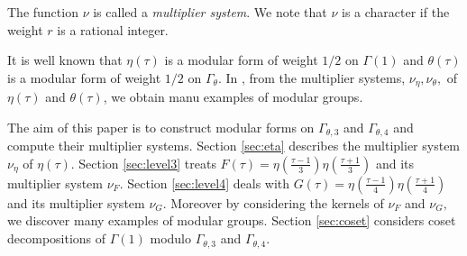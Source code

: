 \documentclass[12pt]{article}
\theoremstyle{definition}
\numberwithin{equation}{section}
\numberwithin{theorem}{section}
\begin{document}
The function $\nu$ is called a  {\it multiplier system}. 
We note that $\nu$ is a character if the weight $r$ is a rational integer.  
\par
It is well known that 
$\eta(\tau)$ is a modular form of weight $\displaystyle 1/2$ on $\Gamma(1)$ and 
$\theta(\tau)$ is a modular form of weight $\displaystyle 1/2$ on $\Gamma_{\theta}.$ 
In \cite{Matsuda}, 
from the multiplier systems, $\nu_{\eta}, \nu_{\theta},$ of $\eta(\tau)$ and $\theta(\tau)$, 
we obtain manu examples of modular groups. 
\par
The aim of this paper 
is to 
construct modular forms on $\Gamma_{\theta,3}$ and $\Gamma_{\theta,4}$ and compute their multiplier systems. 
Section \ref{sec:eta} 
describes the multiplier system $\nu_{\eta}$ of $\eta(\tau)$. 
Section \ref{sec:level3} 
treats
$\displaystyle F(\tau)=\eta \left(\frac{\tau-1}{3} \right) \eta\left(\frac{\tau+1}{3} \right)$ 
and its multiplier system $\nu_{F}.$ 
Section \ref{sec:level4} 
deals with 
$\displaystyle G(\tau)=\eta \left(\frac{\tau-1}{4} \right) \eta\left(\frac{\tau+1}{4} \right)$ 
and its multiplier system $\nu_{G}.$ 
Moreover by considering the kernels of $\nu_{F}$ and $\nu_{G},$ 
we discover many examples of modular groups. 
Section \ref{sec:coset} 
considers 
coset decompositions of $\Gamma(1)$ modulo $\Gamma_{\theta,3}$ and $\Gamma_{\theta,4}.$ 


































\end{document}
